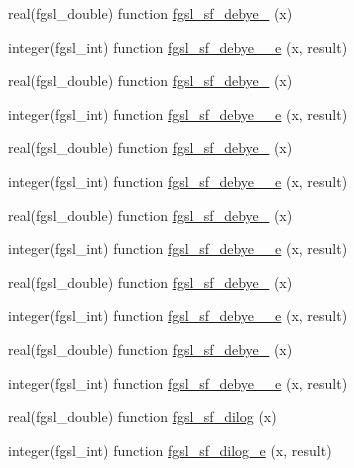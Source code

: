 \begin{DoxyCompactItemize}
\item 
real(fgsl\-\_\-double) function \hyperlink{specfunc_8finc_a4ef82c5fc8e68127eca8f0f2cdbde0bc}{fgsl\-\_\-sf\-\_\-debye\-\_} (x)
\item 
integer(fgsl\-\_\-int) function \hyperlink{specfunc_8finc_a2e5afb8111803eb0b2a7441de6a1170c}{fgsl\-\_\-sf\-\_\-debye\-\_\-\_\-e} (x, result)
\item 
real(fgsl\-\_\-double) function \hyperlink{specfunc_8finc_a62c2ce1dff2f2b1519304904b5b63904}{fgsl\-\_\-sf\-\_\-debye\-\_} (x)
\item 
integer(fgsl\-\_\-int) function \hyperlink{specfunc_8finc_af1e4dedb2969a56cb1fa064ba2afebcf}{fgsl\-\_\-sf\-\_\-debye\-\_\-\_\-e} (x, result)
\item 
real(fgsl\-\_\-double) function \hyperlink{specfunc_8finc_a0ba50e786951a7fcaaa8f6d742895764}{fgsl\-\_\-sf\-\_\-debye\-\_} (x)
\item 
integer(fgsl\-\_\-int) function \hyperlink{specfunc_8finc_aea530ad8b0a50d0364340ff2c08c2f72}{fgsl\-\_\-sf\-\_\-debye\-\_\-\_\-e} (x, result)
\item 
real(fgsl\-\_\-double) function \hyperlink{specfunc_8finc_ac9896ebe16c12552170b1508faae4eda}{fgsl\-\_\-sf\-\_\-debye\-\_} (x)
\item 
integer(fgsl\-\_\-int) function \hyperlink{specfunc_8finc_ab1c4c84cd96400fa02653332c3b476e5}{fgsl\-\_\-sf\-\_\-debye\-\_\-\_\-e} (x, result)
\item 
real(fgsl\-\_\-double) function \hyperlink{specfunc_8finc_aff618cd1aff8bcd5e91919ebd4587bdb}{fgsl\-\_\-sf\-\_\-debye\-\_} (x)
\item 
integer(fgsl\-\_\-int) function \hyperlink{specfunc_8finc_a5b10b4c227a519e516761c97d8235736}{fgsl\-\_\-sf\-\_\-debye\-\_\-\_\-e} (x, result)
\item 
real(fgsl\-\_\-double) function \hyperlink{specfunc_8finc_acfe1f2e0403e22af565ff0456a5bbae9}{fgsl\-\_\-sf\-\_\-debye\-\_} (x)
\item 
integer(fgsl\-\_\-int) function \hyperlink{specfunc_8finc_ad26350c3525af043e0d411b84233b51c}{fgsl\-\_\-sf\-\_\-debye\-\_\-\_\-e} (x, result)
\item 
real(fgsl\-\_\-double) function \hyperlink{specfunc_8finc_a556d535339f0a052f462ea518420e496}{fgsl\-\_\-sf\-\_\-dilog} (x)
\item 
integer(fgsl\-\_\-int) function \hyperlink{specfunc_8finc_a8c1b3284b3462ea295b41cbbf77dd5c2}{fgsl\-\_\-sf\-\_\-dilog\-\_\-e} (x, result)
\item 

\end{DoxyCompactItemize}

